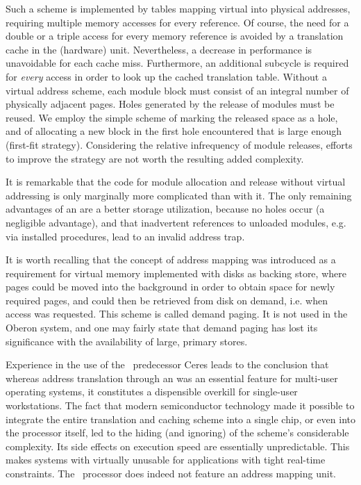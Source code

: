 Such a scheme is implemented by tables mapping virtual into physical addresses, requiring multiple memory accesses for every reference. Of course, the need for a double or a triple access for every memory reference is avoided by a translation cache in the (hardware) unit. Nevertheless, a decrease in performance is unavoidable for each cache miss. Furthermore, an additional subcycle is required for \emph{every} access in order to look up the cached translation table. Without a virtual address scheme, each module block must consist of an integral number of physically adjacent pages. Holes generated by the release of modules must be reused. We employ the simple scheme of marking the released space as a hole, and of allocating a new block in the first hole encountered that is large enough (first-fit strategy). Considering the relative infrequency of module releases, efforts to improve the strategy are not worth the resulting added complexity.

It is remarkable that the code for module allocation and release without virtual addressing is only marginally more complicated than with it. The only remaining advantages of an \MMU are a better storage utilization, because no holes occur (a negligible advantage), and that inadvertent references to unloaded modules, e.g. via installed procedures, lead to an invalid address trap.

It is worth recalling that the concept of address mapping was introduced as a requirement for virtual memory implemented with disks as backing store, where pages could be moved into the background in order to obtain space for newly required pages, and could then be retrieved from disk on demand, i.e. when access was requested. This scheme is called demand paging. It is not used in the Oberon system, and one may fairly state that demand paging has lost its significance with the availability of large, primary stores.

Experience in the use of the \RISC\ predecessor Ceres leads to the conclusion that whereas address translation through an \MMU was an essential feature for multi-user operating systems, it constitutes a dispensible overkill for single-user workstations. The fact that modern semiconductor technology made it possible to integrate the entire translation and caching scheme into a single chip, or even into the processor itself, led to the hiding (and ignoring) of the scheme's considerable complexity. Its side effects on execution speed are essentially unpredictable. This makes systems with \MMU virtually unusable for applications with tight real-time constraints. The \RISC\ processor does indeed not feature an address mapping unit.

